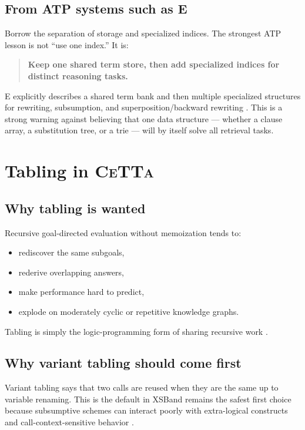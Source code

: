 \documentclass[11pt]{article}
\newcommand{\CeTTa}{\textsc{CeTTa}}
\newcommand{\XSB}{\textsc{XSB}}
\begin{document}
\subsection{From ATP systems such as E}
Borrow the separation of storage and specialized indices.
The strongest ATP lesson is not ``use one index.'' It is:
\begin{quote}
\textbf{Keep one shared term store, then add specialized indices for distinct reasoning tasks.}
\end{quote}

E explicitly describes a shared term bank and then multiple specialized structures for rewriting, subsumption, and superposition/backward rewriting \cite{e_technology}. This is a strong warning against believing that one data structure --- whether a clause array, a substitution tree, or a trie --- will by itself solve all retrieval tasks.

\section{Tabling in \CeTTa}
\subsection{Why tabling is wanted}
Recursive goal-directed evaluation without memoization tends to:
\begin{itemize}
    \item rediscover the same subgoals,
    \item rederive overlapping answers,
    \item make performance hard to predict,
    \item explode on moderately cyclic or repetitive knowledge graphs.
\end{itemize}

Tabling is simply the logic-programming form of sharing recursive work \cite{xsb_definite,xsb_directives}.

\subsection{Why variant tabling should come first}
Variant tabling says that two calls are reused when they are the same up to variable renaming. This is the default in \XSB and remains the safest first choice because subsumptive schemes can interact poorly with extra-logical constructs and call-context-sensitive behavior \cite{xsb_variant,xsb_subsumption,xsb_meta}.
\end{document}
